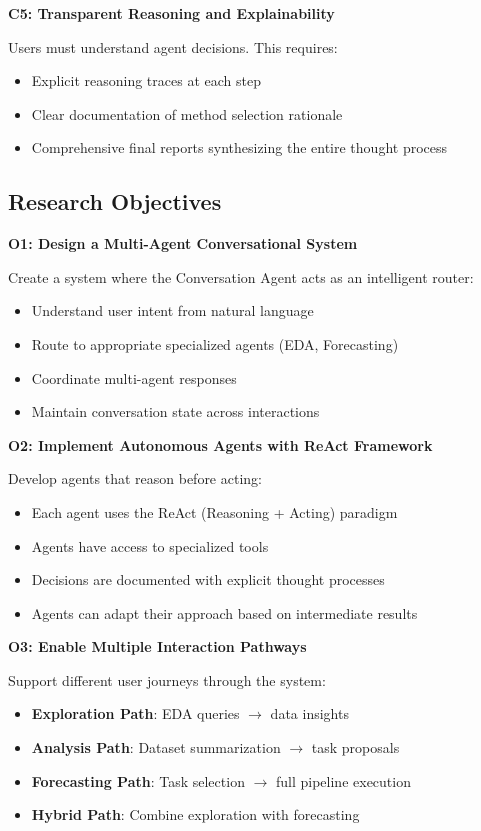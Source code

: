 \documentclass[11pt,a4paper]{article}
\begin{document}
\textbf{C5: Transparent Reasoning and Explainability}

Users must understand agent decisions. This requires:
\begin{itemize}
    \item Explicit reasoning traces at each step
    \item Clear documentation of method selection rationale
    \item Comprehensive final reports synthesizing the entire thought process
\end{itemize}

\subsection{Research Objectives}

\textbf{O1: Design a Multi-Agent Conversational System}

Create a system where the Conversation Agent acts as an intelligent router:
\begin{itemize}
    \item Understand user intent from natural language
    \item Route to appropriate specialized agents (EDA, Forecasting)
    \item Coordinate multi-agent responses
    \item Maintain conversation state across interactions
\end{itemize}

\textbf{O2: Implement Autonomous Agents with ReAct Framework}

Develop agents that reason before acting:
\begin{itemize}
    \item Each agent uses the ReAct (Reasoning + Acting) paradigm
    \item Agents have access to specialized tools
    \item Decisions are documented with explicit thought processes
    \item Agents can adapt their approach based on intermediate results
\end{itemize}

\textbf{O3: Enable Multiple Interaction Pathways}

Support different user journeys through the system:
\begin{itemize}
    \item \textbf{Exploration Path}: EDA queries $\rightarrow$ data insights
    \item \textbf{Analysis Path}: Dataset summarization $\rightarrow$ task proposals
    \item \textbf{Forecasting Path}: Task selection $\rightarrow$ full pipeline execution
    \item \textbf{Hybrid Path}: Combine exploration with forecasting
\end{itemize}
\end{document}
